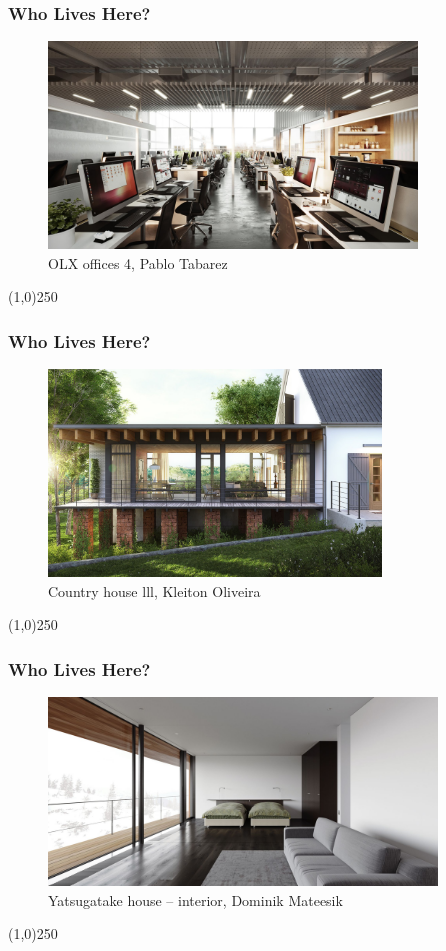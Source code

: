 \begin{frame}
\frametitle{Who Lives Here?}
\begin{figure}
	\centering
	\includegraphics[height=5.5cm]{./img/CGArchViz/Offices.jpg}
	\caption{OLX offices 4, Pablo Tabarez}
	\label{fig:OLXOffices}
\end{figure}
\end{frame}
\begin{center}\line(1,0){250}\end{center}


\begin{frame}
\frametitle{Who Lives Here?}
\begin{figure}
	\centering
	\includegraphics[height=5.5cm]{./img/CGArchViz/Extension}
	\caption{Country house lll, Kleiton Oliveira}
	\label{fig:CountryExtension}
\end{figure}
\end{frame}
\begin{center}\line(1,0){250}\end{center}


\begin{frame}
\frametitle{Who Lives Here?}
\begin{figure}
	\centering
	\includegraphics[height=5cm]{./img/CGArchViz/Yatsugatake.jpg}
	\caption{Yatsugatake house – interior, Dominik Mateesik}
	\label{fig:Yatsugatake}
\end{figure}
\end{frame}
\begin{center}\line(1,0){250}\end{center}


